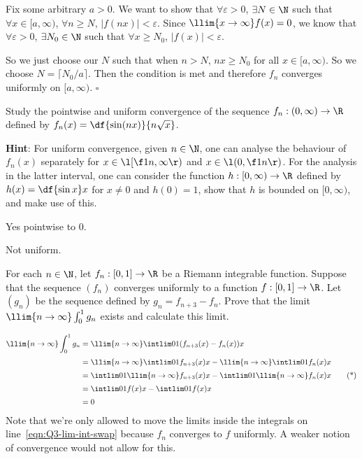 \documentclass[a4paper]{article}
\begin{document}
Fix some arbitrary $a > 0$. We want to show that $\forall \varepsilon > 0$, $\exists N \in \N$ such that $\forall x \in [a, \infty)$, $\forall n \ge N$, $| f(nx) | < \varepsilon$. Since $\llim{x \to \infty} f(x) = 0$, we know that $\forall \varepsilon > 0$, $\exists N_0 \in \N$ such that $\forall x \ge N_0$, $|f(x)| < \varepsilon$. %

So we just choose our $N$ such that when $n > N$, $nx \ge N_0$ for all $x \in [a, \infty)$. So we choose $N = \lceil N_0 / a \rceil$. Then the condition is met and therefore $f_n$ converges uniformly on $[a, \infty)$. %
\hfill$\square$



\begin{questionbody}
Study the pointwise and uniform convergence of the sequence $f_n : (0, \infty) \to \R$ defined by $f_n(x) = \df{\sin(nx)}{n \sqrt x}$.

\textbf{Hint}: For uniform convergence, given $n \in \N$, one can analyse the behaviour of $f_n(x)$ separately for $x \in \l[ \f1n, \infty \r)$ and $x \in \l( 0, \f1n \r)$. For the analysis in the latter interval, one can consider the function $h : [0, \infty) \to \R$ defined by $h(x) = \df{\sin x}x$ for $x \ne 0$ and $h(0) = 1$, show that $h$ is bounded on $[0, \infty)$, and make use of this. %
\end{questionbody}


Yes pointwise to 0.

Not uniform.



\begin{questionbody}
For each $n \in \N$, let $f_n : [0, 1] \to \R$ be a Riemann integrable function. Suppose that the sequence $(f_n)$ converges uniformly to a function $f : [0, 1] \to \R$. Let $(g_n)$ be the sequence defined by $g_n = f_{n+3} - f_n$. Prove that the limit $\llim{n \to \infty} \int_0^1 g_n$ exists and calculate this limit.
\end{questionbody}


\begin{align*}
\llim{n \to \infty} \int_0^1 g_n &= \llim{n \to \infty} \intlim 01 {( f_{n+3}(x) - f_n(x) )} x \\[0.5ex]
&= \llim{n \to \infty} \intlim 01 {f_{n+3}(x)} x - \llim{n \to \infty} \intlim 01 {f_n(x)} x \\[0.5ex]
&= \intlim 01 {\llim{n \to \infty} f_{n+3}(x)} x - \intlim 01 {\llim{n \to \infty} f_n(x)} x \tag{*}\label{eqn:Q3-lim-int-swap} \\[0.5ex]
&= \intlim 01 {f(x)} x - \intlim 01 {f(x)} x \\[0.5ex]
&= 0
\end{align*}
Note that we're only allowed to move the limits inside the integrals on line~\eqref{eqn:Q3-lim-int-swap} because $f_n$ converges to $f$ uniformly. A weaker notion of convergence would not allow for this.
\end{document}
